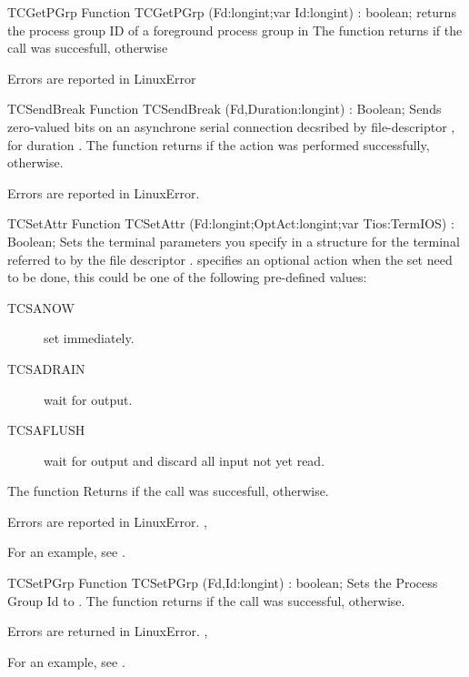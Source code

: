 
\begin{function}{TCGetPGrp}
\Declaration
Function TCGetPGrp (Fd:longint;var Id:longint) : boolean;
\Description
  returns the process group ID of a foreground process group in  
  The function returns  if the call was succesfull, 
  otherwise

\Errors
Errors are reported in LinuxError
\SeeAlso
{}
\end{function}

\begin{function}{TCSendBreak}
\Declaration
Function TCSendBreak (Fd,Duration:longint) : Boolean;
\Description
  Sends zero-valued bits on an asynchrone serial connection decsribed by
  file-descriptor , for duration .
  The function returns  if the action was performed successfully,
 otherwise.

\Errors
Errors are reported in LinuxError.
\SeeAlso
{}
\end{function}

\begin{function}{TCSetAttr}
\Declaration
Function TCSetAttr (Fd:longint;OptAct:longint;var Tios:TermIOS) : Boolean;
\Description
  Sets the terminal parameters you specify in a  structure
 for the terminal
  referred to by the file descriptor .  specifies an 
  optional action when the set need to be done,
  this could be one of the following pre-defined values:
 \begin{description}
\item [TCSANOW\ ] set immediately.
\item [TCSADRAIN\ ] wait for output.
\item [TCSAFLUSH\ ] wait for output and discard all input not yet read. 
\end{description}
The function Returns  if the call was succesfull,  
otherwise.

\Errors
Errors are reported in LinuxError.
\SeeAlso
{}, 
\end{function}
For an example, see .

\begin{function}{TCSetPGrp}
\Declaration
Function TCSetPGrp (Fd,Id:longint) : boolean;
\Description
  Sets the Process Group Id to . 
The function returns  if the call was successful, 
otherwise.

\Errors
Errors are returned in LinuxError.
\SeeAlso
{}, 
\end{function}
For an example, see .

